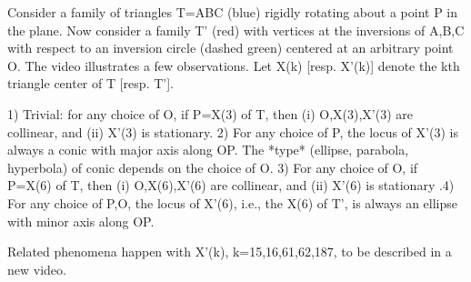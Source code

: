 Consider a family of triangles T=ABC (blue) rigidly rotating about a point P in the plane. Now consider a family T' (red) with vertices at the inversions of A,B,C with respect to an inversion circle (dashed green) centered at an arbitrary point O. The video illustrates a few observations. Let X(k) [resp. X'(k)] denote the kth triangle center of T [resp. T'].

1) Trivial: for any choice of O, if P=X(3) of T, then (i) O,X(3),X'(3) are collinear, and (ii) X'(3) is stationary.
2) For any choice of P, the locus of X'(3) is always a conic with major axis along OP. The *type* (ellipse, parabola, hyperbola) of conic depends on the choice of O.
3) For any choice of O, if P=X(6) of T, then (i) O,X(6),X'(6) are collinear, and (ii) X'(6) is stationary
.4) For any choice of P,O, the locus of X'(6), i.e., the X(6) of T', is always an ellipse with minor axis along OP.

Related phenomena happen with X'(k), k=15,16,61,62,187, to be described in a new video.